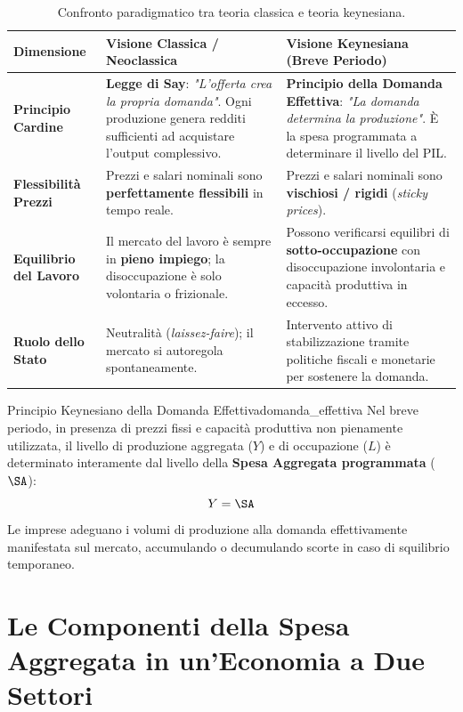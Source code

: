 \begin{table}[htbp]
\centering
\small
\renewcommand{\arraystretch}{1.35}
\begin{tabularx}{\textwidth}{l X X}
\toprule
\textbf{Dimensione} & \textbf{Visione Classica / Neoclassica} & \textbf{Visione Keynesiana (Breve Periodo)} \\
\midrule
\textbf{Principio Cardine} & 
\textbf{Legge di Say}: \textit{"L'offerta crea la propria domanda"}. Ogni produzione genera redditi sufficienti ad acquistare l'output complessivo. & 
\textbf{Principio della Domanda Effettiva}: \textit{"La domanda determina la produzione"}. È la spesa programmata a determinare il livello del PIL. \\
\midrule
\textbf{Flessibilità Prezzi} & 
Prezzi e salari nominali sono \textbf{perfettamente flessibili} in tempo reale. & 
Prezzi e salari nominali sono \textbf{vischiosi / rigidi} (\textit{sticky prices}). \\
\midrule
\textbf{Equilibrio del Lavoro} & 
Il mercato del lavoro è sempre in \textbf{pieno impiego}; la disoccupazione è solo volontaria o frizionale. & 
Possono verificarsi equilibri di \textbf{sotto-occupazione} con disoccupazione involontaria e capacità produttiva in eccesso. \\
\midrule
\textbf{Ruolo dello Stato} & 
Neutralità (\textit{laissez-faire}); il mercato si autoregola spontaneamente. & 
Intervento attivo di stabilizzazione tramite politiche fiscali e monetarie per sostenere la domanda. \\
\bottomrule
\end{tabularx}
\caption{Confronto paradigmatico tra teoria classica e teoria keynesiana.}
\label{tab:say_vs_keynes}
\end{table}

\begin{legge}{Principio Keynesiano della Domanda Effettiva}{domanda_effettiva}
Nel breve periodo, in presenza di prezzi fissi e capacità produttiva non pienamente utilizzata, il livello di produzione aggregata ($Y$) e di occupazione ($L$) è determinato interamente dal livello della \textbf{Spesa Aggregata programmata} ($\SA$):
\begin{equation}
    Y = \SA
\end{equation}
Le imprese adeguano i volumi di produzione alla domanda effettivamente manifestata sul mercato, accumulando o decumulando scorte in caso di squilibrio temporaneo.
\end{legge}

\section{Le Componenti della Spesa Aggregata in un'Economia a Due Settori}

